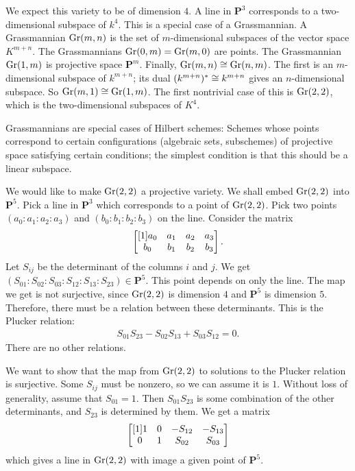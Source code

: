 \documentclass [11 pt, oneside] {article}
\begin{document}
\begin{example}\label{}
We expect this variety to be of dimension $4$. A line in $\mathbf{P}^3$ corresponds to a two-dimensional subspace of $k^4$. This is a special case of a Grassmannian. A Grassmannian $\operatorname{Gr}(m,n)$ is the set of $m$-dimensional subspaces of the vector space $K^{m+n}$. The Grassmannians $\operatorname{Gr}(0,m)=\operatorname{Gr} (m,0)$ are points. The Grassmannian $\operatorname{Gr}(1,m)$ is projective space $\mathbf{P}^m$. Finally, $\operatorname{Gr}(m,n)\cong \operatorname{Gr} (n,m)$. The first is an $m$-dimensional subspace of $k^{m+n}$; its dual $(k^{m+n})^*\cong k^{m+n}$ gives an $n$-dimensional subspace. So $\operatorname{Gr}(m,1)\cong \operatorname{Gr}(1,m)$. The first nontrivial case of this is $\operatorname{Gr}(2,2)$, which is the two-dimensional subspaces of $K^4$.

Grassmannians are special cases of Hilbert schemes: Schemes whose points correspond to certain configurations (algebraic sets, subschemes) of projective space satisfying certain conditions; the simplest condition is that this should be a linear subspace.

We would like to make $\operatorname{Gr}(2,2)$ a projective variety. We shall embed $\operatorname{Gr}(2,2)$ into $\mathbf{P}^5$. Pick a line in $\mathbf{P}^3$ which corresponds to a point of $\operatorname{Gr}(2,2)$. Pick two points $(a_0:a_1:a_2:a_3)$ and $(b_0:b_1:b_2:b_3)$ on the line. Consider the matrix
\begin{align*}
	\begin{bmatrix} [1] a_0&a_1&a_2&a_3\\b_0&b_1&b_2&b_3\end{bmatrix}.
\end{align*}
Let $S_{ij}$ be the determinant of the columns $i$ and $j$. We get $(S_{01}:S_{02}:S_{03}:S_{12}:S_{13}:S_{23}) \in \mathbf{P}^5$. This point depends on only the line. The map we get is not surjective, since $\operatorname{Gr}(2,2)$ is dimension $4$ and $\mathbf{P}^5$ is dimension $5$. Therefore, there must be a relation between these determinants. This is the Plucker relation:
\begin{align*}
	S_{01}S_{23}-S_{02}S_{13}+S_{03}S_{12}=0.
\end{align*}
There are no other relations.

We want to show that the map from $\operatorname{Gr}(2,2)$ to solutions to the Plucker relation is surjective. Some $S_{ij}$ must be nonzero, so we can assume it is $1$. Without loss of generality, assume that $S_{01}=1$. Then $S_{01}S_{23}$ is some combination of the other determinants, and $S_{23}$ is determined by them. We get a matrix
\begin{align*}
	\begin{bmatrix} [1] 1&0&-S_{12}&-S_{13}\\0&1&S_{02}&S_{03}\end{bmatrix}
\end{align*}
which gives a line in $\operatorname{Gr}(2,2)$ with image a given point of $\mathbf{P}^5$.
\end{example}
\end{document}
